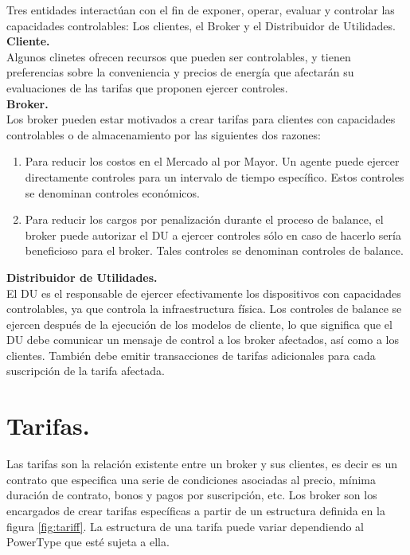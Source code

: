 Tres entidades interactúan con el fin de exponer, operar, evaluar y controlar las capacidades controlables: Los clientes, el Broker y el Distribuidor de Utilidades.\\

\textbf{Cliente.}\\

Algunos clinetes ofrecen recursos que pueden ser controlables, y tienen preferencias sobre la conveniencia y precios de energía que afectarán su evaluaciones de las tarifas que proponen ejercer controles.\\

\textbf{Broker.}\\

Los broker pueden estar motivados a crear tarifas para clientes con capacidades controlables o de almacenamiento por las siguientes dos razones:

\begin{enumerate}
	\item Para reducir los costos en el Mercado al por Mayor. Un agente puede ejercer directamente controles para un intervalo de tiempo específico. Estos controles se denominan controles económicos.
	\item Para reducir los cargos por penalización durante el proceso de balance, el broker puede autorizar el DU a ejercer controles sólo en caso de hacerlo sería beneficioso para el broker. Tales controles se denominan controles de balance.
\end{enumerate}

\textbf{Distribuidor de Utilidades.}\\

El DU es el responsable de ejercer efectivamente los dispositivos con capacidades controlables, ya que controla la infraestructura física. Los controles de balance se ejercen después de la ejecución de los modelos de cliente, lo que significa que el DU debe comunicar un mensaje de control a los broker afectados, así como a los clientes. También debe emitir transacciones de tarifas adicionales para cada suscripción de la tarifa afectada.

\section{Tarifas.} \label{sec:tariff}
Las tarifas son la relación existente entre un broker y sus clientes, es decir es un contrato que especifica una serie de condiciones asociadas al precio, mínima duración de contrato, bonos y pagos por suscripción, etc. Los broker son los encargados de crear tarifas específicas a partir de un estructura definida  en la figura \ref{fig:tariff}. La estructura de una tarifa puede variar dependiendo al PowerType que esté sujeta a ella.

